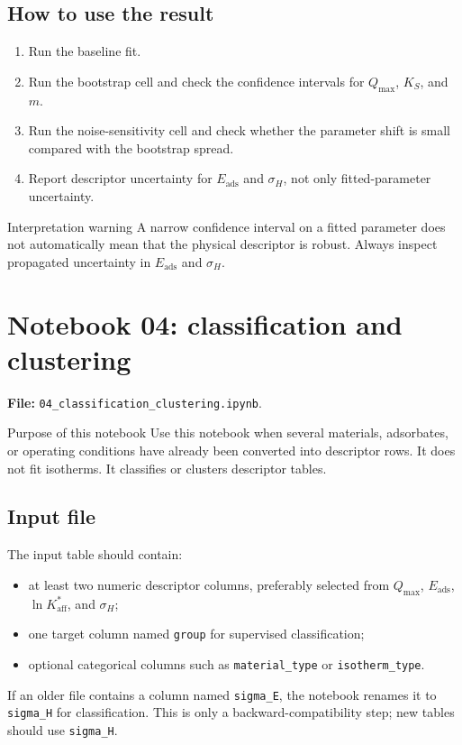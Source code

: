 \documentclass[journal=jacsat,manuscript=article]{achemso}
\begin{document}
\subsection*{How to use the result}

\begin{enumerate}
	\item Run the baseline fit.
	\item Run the bootstrap cell and check the confidence intervals for
	\(Q_{\max}\), \(K_S\), and \(m\).
	\item Run the noise-sensitivity cell and check whether the parameter shift
	is small compared with the bootstrap spread.
	\item Report descriptor uncertainty for \(E_{\mathrm{ads}}\) and
	\(\sigma_H\), not only fitted-parameter uncertainty.
\end{enumerate}

\begin{redbox}{Interpretation warning}
	A narrow confidence interval on a fitted parameter does not automatically
	mean that the physical descriptor is robust. Always inspect propagated
	uncertainty in \(E_{\mathrm{ads}}\) and \(\sigma_H\).
\end{redbox}

\section{Notebook 04: classification and clustering}
\label{app:si_notebook_04}

\noindent\textbf{File:} \texttt{04\_classification\_clustering.ipynb}.

\begin{bluebox}{Purpose of this notebook}
	Use this notebook when several materials, adsorbates, or operating
	conditions have already been converted into descriptor rows. It does not
	fit isotherms. It classifies or clusters descriptor tables.
\end{bluebox}

\subsection*{Input file}

The input table should contain:
\begin{itemize}
	\item at least two numeric descriptor columns, preferably selected from
	\(Q_{\max}\), \(E_{\mathrm{ads}}\), \(\ln K_{\mathrm{aff}}^{\ast}\), and
	\(\sigma_H\);
	\item one target column named \texttt{group} for supervised classification;
	\item optional categorical columns such as \texttt{material\_type} or
	\texttt{isotherm\_type}.
\end{itemize}
If an older file contains a column named \texttt{sigma\_E}, the notebook
renames it to \texttt{sigma\_H} for classification. This is only a
backward-compatibility step; new tables should use \texttt{sigma\_H}.
\end{document}
